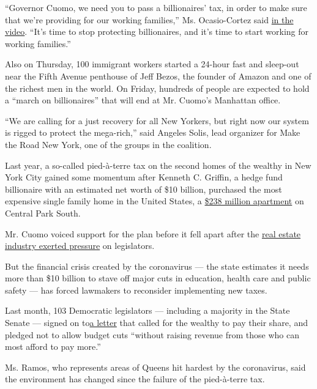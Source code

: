 ``Governor Cuomo, we need you to pass a billionaires' tax, in order to
make sure that we're providing for our working families,'' Ms.
Ocasio-Cortez said
\href{https://www.youtube.com/watch?v=cIA1ex88faM\&feature=youtu.be}{in
the video}. ``It's time to stop protecting billionaires, and it's time
to start working for working families.''

Also on Thursday, 100 immigrant workers started a 24-hour fast and
sleep-out near the Fifth Avenue penthouse of Jeff Bezos, the founder of
Amazon and one of the richest men in the world. On Friday, hundreds of
people are expected to hold a ``march on billionaires'' that will end at
Mr. Cuomo's Manhattan office.

``We are calling for a just recovery for all New Yorkers, but right now
our system is rigged to protect the mega-rich,'' said Angeles Solis,
lead organizer for Make the Road New York, one of the groups in the
coalition.

Last year, a so-called pied-à-terre tax on the second homes of the
wealthy in New York City gained some momentum after Kenneth C. Griffin,
a hedge fund billionaire with an estimated net worth of \$10 billion,
purchased the most expensive single family home in the United States, a
\href{https://www.nytimes.com/2019/01/24/nyregion/238-million-penthouse-sale.html}{\$238
million apartment} on Central Park South.

Mr. Cuomo voiced support for the plan before it fell apart after the
\href{https://www.nytimes.com/2019/03/29/nyregion/pied-a-terre-tax.html}{real
estate industry exerted pressure} on legislators.

But the financial crisis created by the coronavirus --- the state
estimates it needs more than \$10 billion to stave off major cuts in
education, health care and public safety --- has forced lawmakers to
reconsider implementing new taxes.

Last month, 103 Democratic legislators --- including a majority in the
State Senate --- signed on
to\href{http://fiscalpolicy.org/wp-content/uploads/2020/06/Statement-of-Principles-6.pdf}{a
letter} that called for the wealthy to pay their share, and pledged not
to allow budget cuts ``without raising revenue from those who can most
afford to pay more.''

Ms. Ramos, who represents areas of Queens hit hardest by the
coronavirus, said the environment has changed since the failure of the
pied-à-terre tax.

\href{https://www.nytimes.com/news-event/coronavirus?action=click\&pgtype=Article\&state=default\&region=MAIN_CONTENT_3\&context=storylines_faq}{}

